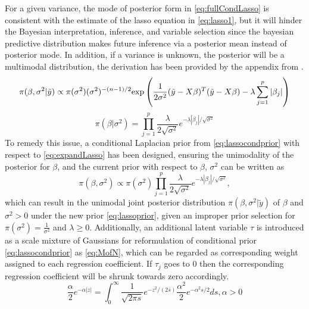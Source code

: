 For a given variance, the mode of posterior form in \autoref{eq:fullCondLasso} is consistent with the estimate of the lasso equation in \autoref{eq:lasso1}, but it will hinder the Bayesian interpretation, inference, and variable selection since the bayesian predictive distribution makes future inference via a posterior mean instead of posterior mode.
In addition, if a variance is unknown, the posterior will be a multimodal distribution, the derivation has been provided by the appendix from \cite{park_casella_2008}.
\begin{equation}
	\label{eq:fullCondLasso}
	\pi(\beta,\sigma^2|\tilde{y}) \propto \pi(\sigma^2)(\sigma^2)^{-(n-1)/2}\textnormal{exp}\left(\frac{1}{2\sigma^2}(\tilde{y}-X\beta)^T(\tilde{y}-X\beta)-\lambda\sum_{j=1}^p|\beta_j|\right)
\end{equation}
\begin{equation}
	\label{eq:lassocondprior}
	\pi(\beta |\sigma^2) = \prod_{j=1}^p \frac{\lambda}{2\sqrt{\sigma^2}} e^{-\lambda|\beta_j|/\sqrt{\sigma^2}}
\end{equation}
To remedy this issue, a conditional Laplacian prior from \autoref{eq:lassocondprior} with respect to \autoref{eq:expandLasso} has been designed, ensuring the unimodality of the posterior for $\beta$, and the current prior with respect to $\beta$, $\sigma^2$  can be written as
\begin{equation}
	\label{eq:lassoprior}
	\pi(\beta,\sigma^2) \propto \pi(\sigma^2) \prod_{j=1}^p \frac{\lambda}{2\sqrt{\sigma^2}} e^{-\lambda|\beta_j|/\sqrt{\sigma^2}},
\end{equation}
which can result in the unimodal joint posterior distribution $\pi(\beta,\sigma^2|\tilde{y})$ of $\beta$ and $\sigma^2 > 0$ under the new prior \autoref{eq:lassoprior}, given an improper prior selection for $\pi(\sigma^2) = \frac{1}{\sigma^2}$ and $\lambda \geq 0$.
Additionally, an additional latent variable $\tau$ is introduced as a scale mixture of Gaussians for reformulation of conditional prior \autoref{eq:lassocondprior} as \autoref{eq:MofN}, which can be regarded as corresponding weight assigned to each regression coefficient. If $\tau_j$ goes to 0 then the corresponding regression coefficient will be shrunk towards zero accordingly.
\begin{equation}
	\label{eq:MofN}
	\frac{\alpha}{2}e^{-\alpha|z|} = \int_{0}^{\infty} \frac{1}{\sqrt{2\pi s}}e^{-z^2/(2s)} \frac{\alpha^2}{2}e^{-\alpha^2s/2}ds, \alpha > 0
\end{equation}

